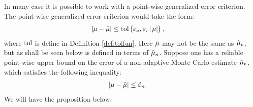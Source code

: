 \documentclass{iitthesis}
\begin{document}
In many case it is possible to work with a point-wise generalized error criterion. 
The point-wise generalized error criterion would take the form:
\begin{align}|\mu -\tilde{\mu}| \leq \text{tol} \left(\varepsilon_a,\varepsilon_r \left \lvert \mu \right \rvert\right),\label{pointwisegeneralizederror} 
\end{align}
where $\operatorname{tol}$ is define in Definition \ref{def:tolfun}. Here $\tilde{\mu}$ may not be the same as $\hat{\mu}_n$, but as shall be seen below is defined in terms of $\hat{\mu}_n$. Suppose one has a reliable point-wise upper bound on the error of a non-adaptive Monte Carlo estimate $\hat{\mu}_n$, which satisfies the following inequality:
\begin{align}
|\mu-\hat{\mu}| \leq \hat{\varepsilon}_n.  \label{pointwiseerrorbound} 
\end{align} We will have the proposition below.
\end{document}
